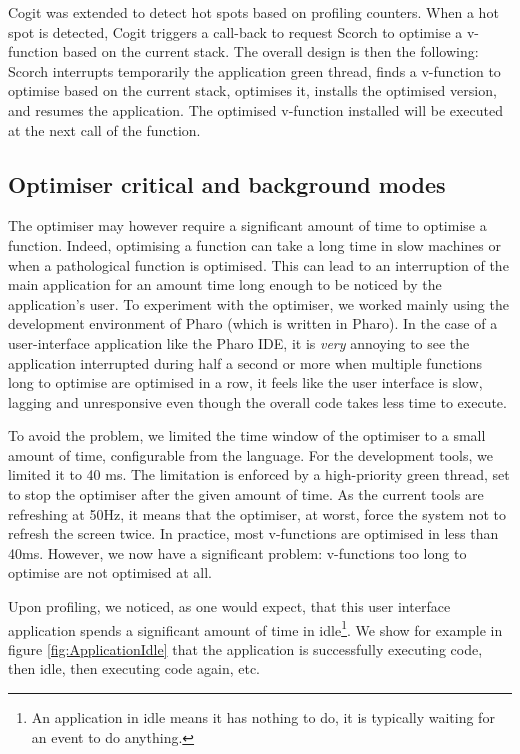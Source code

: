 \documentclass[a4paper,12pt,twoside]{../includes/ThesisStyle}
\begin{document}
Cogit was extended to detect hot spots based on profiling counters. When a hot spot is detected, Cogit triggers a call-back to request Scorch to optimise a v-function based on the current stack. The overall design is then the following: Scorch interrupts temporarily the application green thread, finds a v-function to optimise based on the current stack, optimises it, installs the optimised version, and resumes the application. The optimised v-function installed will be executed at the next call of the function.

\subsection{Optimiser critical and background modes}

The optimiser may however require a significant amount of time to optimise a function. Indeed, optimising a function can take a long time in slow machines or when a pathological function is optimised. This can lead to an interruption of the main application for an amount time long enough to be noticed by the application's user. To experiment with the optimiser, we worked mainly using the development environment of Pharo (which is written in Pharo). In the case of a user-interface application like the Pharo IDE, it is \emph{very} annoying to see the application interrupted during half a second or more when multiple functions long to optimise are optimised in a row, it feels like the user interface is slow, lagging and unresponsive even though the overall code takes less time to execute.

To avoid the problem, we limited the time window of the optimiser to a small amount of time, configurable from the language. For the development tools, we limited it to 40 ms. The limitation is enforced by a high-priority green thread, set to stop the optimiser after the given amount of time. As the current tools are refreshing at 50Hz, it means that the optimiser, at worst, force the system not to refresh the screen twice. In practice, most v-functions are optimised in less than 40ms. However, we now have a significant problem: v-functions too long to optimise are not optimised at all.

Upon profiling, we noticed, as one would expect, that this user interface application spends a significant amount of time in idle\footnote{An application in idle means it has nothing to do, it is typically waiting for an event to do anything.}. We show for example in figure \ref{fig:ApplicationIdle} that the application is successfully executing code, then idle, then executing code again, etc. 
\end{document}
